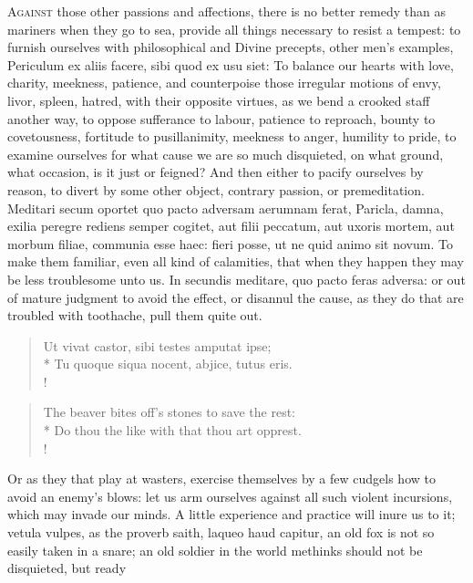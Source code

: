 {\lettrine{A}{gainst} those other passions and affections, there is no better
remedy than as mariners when they go to sea, provide all things
necessary to resist a tempest: to furnish ourselves with philosophical
and Divine precepts, other men's examples, Periculum ex aliis
facere, sibi quod ex usu siet: To balance our hearts with love,
charity, meekness, patience, and counterpoise those irregular motions
of envy, livor, spleen, hatred, with their opposite virtues, as we bend
a crooked staff another way, to oppose sufferance to labour,
patience to reproach, bounty to covetousness, fortitude to
pusillanimity, meekness to anger, humility to pride, to examine
ourselves for what cause we are so much disquieted, on what ground,
what occasion, is it just or feigned? And then either to pacify
ourselves by reason, to divert by some other object, contrary passion,
or premeditation. Meditari secum oportet quo pacto adversam
aerumnam ferat, Paricla, damna, exilia peregre rediens semper cogitet,
aut filii peccatum, aut uxoris mortem, aut morbum filiae, communia esse
haec: fieri posse, ut ne quid animo sit novum. To make them familiar,
even all kind of calamities, that when they happen they may be less
troublesome unto us. In secundis meditare, quo pacto feras adversa: or
out of mature judgment to avoid the effect, or disannul the cause, as
they do that are troubled with toothache, pull them quite out.
%
\begin{latin}%
\begin{verse}%
Ut vivat castor, sibi testes amputat ipse;\\*
Tu quoque siqua nocent, abjice, tutus eris.\\!
\end{verse}%
\end{latin}%
\translationrule%
\begin{verse}%
The beaver bites off's stones to save the rest:\\*
Do thou the like with that thou art opprest.\\!
\end{verse}%
%
Or as they that play at wasters, exercise themselves by a few cudgels
how to avoid an enemy's blows: let us arm ourselves against all such
violent incursions, which may invade our minds. A little experience and
practice will inure us to it; vetula vulpes, as the proverb saith,
laqueo haud capitur, an old fox is not so easily taken in a snare; an
old soldier in the world methinks should not be disquieted, but ready
}
